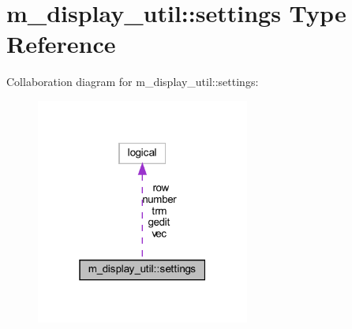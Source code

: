 \hypertarget{structm__display__util_1_1settings}{}\section{m\+\_\+display\+\_\+util\+:\+:settings Type Reference}
\label{structm__display__util_1_1settings}


Collaboration diagram for m\+\_\+display\+\_\+util\+:\+:settings\+:
\nopagebreak
\begin{figure}[H]
\begin{center}
\leavevmode
\includegraphics[width=199pt]{structm__display__util_1_1settings__coll__graph}
\end{center}
\end{figure}
